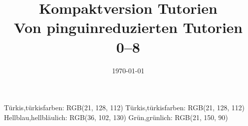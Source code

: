 \def\thpath{./data}
\RequirePackage{color-palettes}
{Türkis,türkisfarben: RGB(21, 128, 112)}
{Türkis,türkisfarben: RGB(21, 128, 112)}
{Hellblau,hellbläulich: RGB(36, 102, 130)}
{Grün,grünlich: RGB(21, 150, 90)}
\def\btdmopts{color=paletteA}%
\def\btdmmode{lightmode-fill}

\usepackage{fmtcount}

%
%
\fullfalse
\def\maxtut{8}
\titlenumber{0--\maxtut}
\title[Alle Tutorien 0--\maxtut]{Kompaktversion Tutorien\\\small Von pinguinreduzierten Tutorien 0--\maxtut}
\date{\sffamily\today}


\let\oldinputif\InputIfFileExists

\makeatletter
\usepackage{pgfcalendar}
\edef\semesterstartyear{2022}
\def\startkwofsemester{16} %
\newcount\@kwconverter
\newcount\@firstweekday
{}
\def\getstartdayofweek#1#2{%
      \ifnum#1<\startkwofsemester \edef\@year{\the\numexpr\semesterstartyear+1}%
      \else\let\@year\semesterstartyear\fi
      \pgfcalendardatetojulian{\@year-1-1}{\@kwconverter}\pgfcalendarjuliantoweekday\@kwconverter\@firstweekday
            \edef\@day{\the\numexpr#1*7-\number\@firstweekday+#2\relax}%
      \pgfcalendardatetojulian{\@year-1-1+\@day}{\@kwconverter}%
      \pgfcalendarjuliantodate{\@kwconverter}\@year\@month\@day
      \DTMdisplaydate\@year\@month\@day\m@ne\relax
}

\def\getKwRange#1{\getstartdayofweek{#1}0\,---\,\getstartdayofweek{#1}6}

